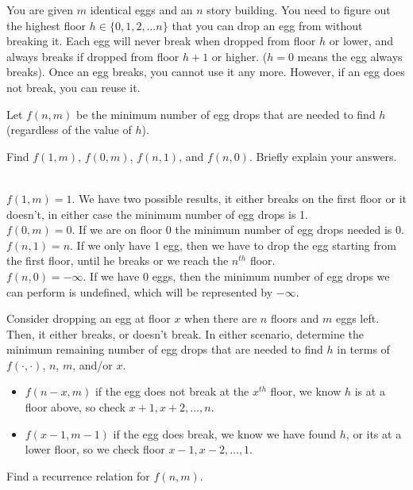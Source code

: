 \documentclass[11pt]{article}
\begin{document}
\newpage


You are given $m$ identical eggs and an $n$ story building. You need to figure out the highest floor $h \in \{0, 1, 2, \ldots n\}$ that you can drop an egg from without breaking it. Each egg will never break when dropped from floor $h$ or lower, and always breaks if dropped from floor $h+1$ or higher. ($h = 0$ means the egg always breaks). Once an egg breaks, you cannot use it any more. However, if an egg does not break, you can reuse it.

Let $f(n, m)$ be the minimum number of egg drops that are needed to find $h$ (regardless of the value of $h$).

\begin{subparts}
\subpart Find $f(1,m)$, $f(0, m)$, $f(n,1)$, and $f(n,0)$. Briefly explain your answers.\\
\begin{solution}\\
    $f(1, m) = 1$. We have two possible results, it either breaks on the first floor or it doesn't, in either case the minimum number of egg drops is 1.\\
    $f(0, m) = 0$. If we are on floor 0 the minimum number of egg drops needed is 0.\\
    $f(n, 1) = n$. If we only have 1 egg, then we have to drop the egg starting from the first floor, until
    he breaks or we reach the $n^{th}$ floor.\\
    $f(n, 0) = -\infty$. If we have 0 eggs, then the minimum number of egg drops we can perform is undefined, which will be represented by $-\infty$.
\end{solution}
\subpart Consider dropping an egg at floor $x$ when there are $n$ floors and $m$ eggs left. Then, it either breaks, or doesn't break. In either scenario, determine the minimum remaining number of egg drops that are needed to find $h$ in terms of $f(\cdot, \cdot)$, $n$, $m$, and/or $x$.
\begin{solution}
    \begin{itemize}
        \item $f(n-x, m)$ if the egg does not break at the $x^{th}$ floor, we know $h$ is at a floor above, so check $x+1, x+2, \dots, n$.
        \item $f(x-1, m-1)$ if the egg does break, we know we have found $h$, or its at a lower floor, so we check floor $x-1, x-2, \dots, 1$.
    \end{itemize}
\end{solution}
\subpart Find a recurrence relation for $f(n,m)$. 


\end{subparts}
\end{document}
